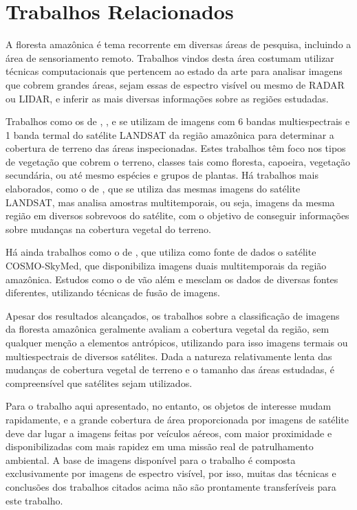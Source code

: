\chapter{Trabalhos Relacionados}\label{cap:trabalhos}

A floresta amazônica é tema recorrente em diversas áreas de pesquisa, incluindo a área de sensoriamento remoto. Trabalhos vindos desta área costumam utilizar técnicas computacionais que pertencem ao estado da arte para analisar imagens que cobrem grandes áreas, sejam essas de espectro visível ou mesmo de RADAR ou LIDAR, e inferir as mais diversas informações sobre as regiões estudadas.

Trabalhos como os de , ,  e  se utilizam de imagens com 6 bandas multiespectrais e 1 banda termal do satélite LANDSAT da região amazônica para determinar a cobertura de terreno das áreas inspecionadas. Estes trabalhos têm foco nos tipos de vegetação que cobrem o terreno, classes tais como floresta, capoeira, vegetação secundária, ou até mesmo espécies e grupos de plantas. Há trabalhos mais elaborados, como o de , que se utiliza das mesmas imagens do satélite LANDSAT, mas analisa amostras multitemporais, ou seja, imagens da mesma região em diversos sobrevoos do satélite, com o objetivo de conseguir informações sobre mudanças na cobertura vegetal do terreno.

Há ainda trabalhos como o de \cite{azevedo:2014}, que utiliza como fonte de dados o satélite COSMO-SkyMed,  que disponibiliza imagens duais multitemporais da região amazônica. Estudos como o de  vão além e mesclam os dados de diversas fontes diferentes, utilizando técnicas de fusão de imagens.

Apesar dos resultados alcançados, os trabalhos sobre a classificação de imagens da floresta amazônica geralmente avaliam a cobertura vegetal da região, sem qualquer menção a elementos antrópicos, utilizando para isso imagens termais ou multiespectrais de diversos satélites. Dada a natureza relativamente lenta das mudanças de cobertura vegetal de terreno e o tamanho das áreas estudadas, é compreensível que satélites sejam utilizados.

Para o trabalho aqui apresentado, no entanto, os objetos de interesse mudam rapidamente, e a grande cobertura de área proporcionada por imagens de satélite deve dar lugar a imagens feitas por veículos aéreos, com maior proximidade e disponibilizadas com mais rapidez em uma missão real de patrulhamento ambiental. A base de imagens disponível para o trabalho é composta exclusivamente por imagens de espectro visível, por isso, muitas das técnicas e conclusões dos trabalhos citados acima não são prontamente transferíveis para este trabalho.

